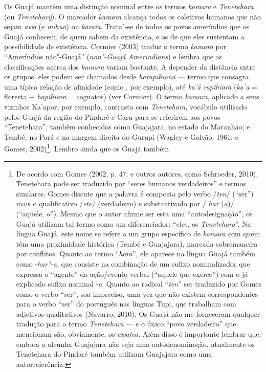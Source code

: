Os Guajá mantêm uma distinção nominal entre os termos \emph{kamara} e
\emph{Tenetehara} (ou \emph{Teneteharỹ}). O marcador \emph{kamara}
alcança todos os coletivos humanos que não sejam \emph{awa} (e
\emph{mihua}) ou \emph{karaia}. Trata"-se de todos os povos ameríndios
que os Guajá conhecem, de quem sabem da existência, e os de que eles
sustentam a possibilidade de existência. Cormier (2003) traduz o termo
\emph{kamara} por ``Ameríndios não"-Guajá'' (\emph{non"-Guajá
Amerindians}) e lembra que as classificações acerca dos \emph{kamara}
variam bastante. A depender da distância entre os grupos, eles podem ser
chamados desde \emph{harapihianã} --- termo que consagra uma típica
relação de afinidade (como , por exemplo), até \emph{ka'á rapihiara}
(\emph{ka'a} = floresta + \emph{hapihiara} = cognatos) (ver Cormier). O
termo \emph{kamara}, aplicado a seus vizinhos Ka'apor, por exemplo,
contrasta com \emph{Tenetehara}, vocábulo utilizado pelos Guajá da
região do Pindaré e Caru para se referirem aos povos ``Tenetehara'',
também conhecidos como Guajajara, no estado do Maranhão; e Tembé, no
Pará e na margem direita do Gurupi (Wagley e Galvão, 1961; e Gomes,
2002)\footnote{De acordo com Gomes (2002, p. 47; e outros autores, como
  Schroeder, 2010), Tenetehara pode ser traduzido por ``seres humanos
      verdadeiros'' e termos similares. Gomes discute que a palavra é
  composta pelo verbo /\emph{ten}/ (``ser'') mais o qualificativo
  /\emph{ete}/ (verdadeiro) e substantivado por / \emph{har} (\emph{a})/
  (``aquele, o''). Mesmo que o autor afirme ser esta uma ``autodesignação'',
  os Guajá utilizam tal termo como um diferenciador: ``eles, os
      \emph{Tenetehara}''. Na língua Guajá, este nome se refere a um grupo
  específico de \emph{kamara} com quem têm uma proximidade histórica
  (Tembé e Guajajara), marcada sobremaneira por conflitos. Quanto ao
  termo ``\emph{hara}'', ele aparece na língua Guajá também como
  -\emph{har"-a}, que consiste na combinação de um sufixo nominalizador
  que expressa o ``agente'' da ação/evento verbal (``aquele que
  exerce'') com o já explicado sufixo nominal -\emph{a}. Quanto ao
  radical ``\emph{ten}'' ser traduzido por Gomes como o verbo ``ser'', soa
  impreciso, uma vez que não existem correspondentes para o verbo ``ser''
  do português nas línguas Tupi, que trabalham com adjetivos
  qualitativos (Navarro, 2010). Os Guajá não me forneceram qualquer
  tradução para o termo \emph{Tenetehara} --- e o único ``povo verdadeiro''
  que mencionam são, obviamente, os \emph{awatea}. Além disso é
  importante lembrar que, embora a alcunha Guajajara não seja uma
  autodenominação, atualmente os Tenetehara do Pindaré também utilizam
  Guajajara como uma autorreferência.}. Lembro ainda que os Guajá também
